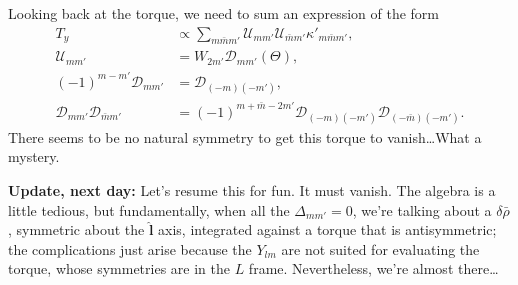 \documentclass[12pt]{article}
\newcommand*{\bm}[1]{\boldsymbol{\mathbf{#1}}}
\newcommand*{\uv}[1]{\hat{\bm{#1}}}
\begin{document}
Looking back at the torque, we need to sum an expression of the form
\begin{align}
    T_{y}
        &\propto \sum\limits_{m\bar{m}m'}
            \mathcal{U}_{mm'}\mathcal{U}_{\bar{m}m'}\kappa'_{m\bar{m}m'},\\
    \mathcal{U}_{mm'}
        &= W_{2m'}\mathcal{D}_{mm'}(\Theta),\\
    (-1)^{m - m'}\mathcal{D}_{mm'} &= \mathcal{D}_{(-m)(-m')},\\
    \mathcal{D}_{mm'}\mathcal{D}_{\bar{m}m'}
        &= (-1)^{m + \bar{m} - 2m'}
            \mathcal{D}_{(-m)(-m')}\mathcal{D}_{(-\bar{m})(-m')}.
\end{align}
There seems to be no natural symmetry to get this torque to vanish\dots What a
mystery.

\textbf{Update, next day:} Let's resume this for fun. It must vanish. The
algebra is a little tedious, but fundamentally, when all the $\Delta_{mm'} = 0$,
we're talking about a $\delta \bar{\rho}$, symmetric about the $\uv{l}$ axis,
integrated against a torque that is antisymmetric; the complications just arise
because the $Y_{lm}$ are not suited for evaluating the torque, whose symmetries
are in the $L$ frame. Nevertheless, we're almost there\dots
\end{document}
